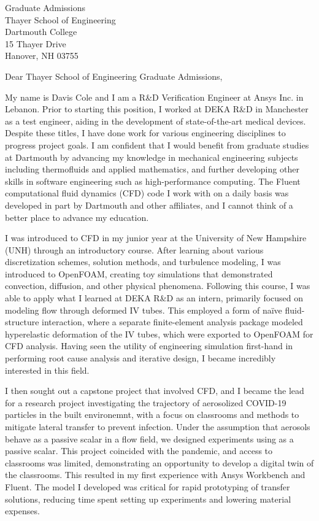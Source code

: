 \documentclass{letter}
\begin{document}
\begin{letter}{Graduate Admissions \\ Thayer School of Engineering \\ Dartmouth College \\ 15 Thayer Drive \\ Hanover, NH 03755}
    \opening{Dear Thayer School of Engineering Graduate Admissions,}

    My name is Davis Cole and I am a R\&D Verification Engineer at Ansys Inc. in Lebanon.
    Prior to starting this position, I worked at DEKA R\&D in Manchester as a test engineer, aiding in the development 
    of state-of-the-art medical devices. Despite these titles, I have done work for various engineering disciplines to 
    progress project goals. I am confident that I would benefit from graduate studies at Dartmouth by advancing my knowledge 
    in mechanical engineering subjects including thermofluids and applied mathematics, and further developing other skills 
    in software engineering such as high-performance computing. The Fluent computational fluid dynamics (CFD) code I work with on a 
    daily basis was developed in part by Dartmouth and other affiliates, and I cannot think of a better place to advance my education.

    I was introduced to CFD in my junior year at the University of New Hampshire (UNH) through an introductory course.
    After learning about various discretization schemes, solution methods, and turbulence modeling, I was introduced to OpenFOAM,
    creating toy simulations that demonstrated convection, diffusion, and other physical phenomena. Following this course,
    I was able to apply what I learned at DEKA R\&D as an intern, primarily focused on modeling flow through deformed IV tubes. 
    This employed a form of na\"ive fluid-structure interaction, where a separate finite-element analysis package modeled hyperelastic 
    deformation of the IV tubes, which were exported to OpenFOAM for CFD analysis. Having seen the utility of engineering 
    simulation first-hand in performing root cause analysis and iterative design, I became incredibly interested in this field.

    I then sought out a capstone project that involved CFD, and I became the lead for a research project investigating the trajectory 
    of aerosolized COVID-19 particles in the built environemnt, with a focus on classrooms and methods to mitigate lateral transfer to 
    prevent infection. Under the assumption that aerosols behave as a passive scalar in a flow field, we designed experiments using
     as a passive scalar. This project coincided with the pandemic, and access to classrooms was limited, demonstrating an 
    opportunity to develop a digital twin of the classrooms. This resulted in my first experience with Ansys Workbench and Fluent. 
    The model I developed was critical for rapid prototyping of transfer solutions, reducing time spent setting up experiments and 
    lowering material expenses.


\end{letter}
\end{document}
